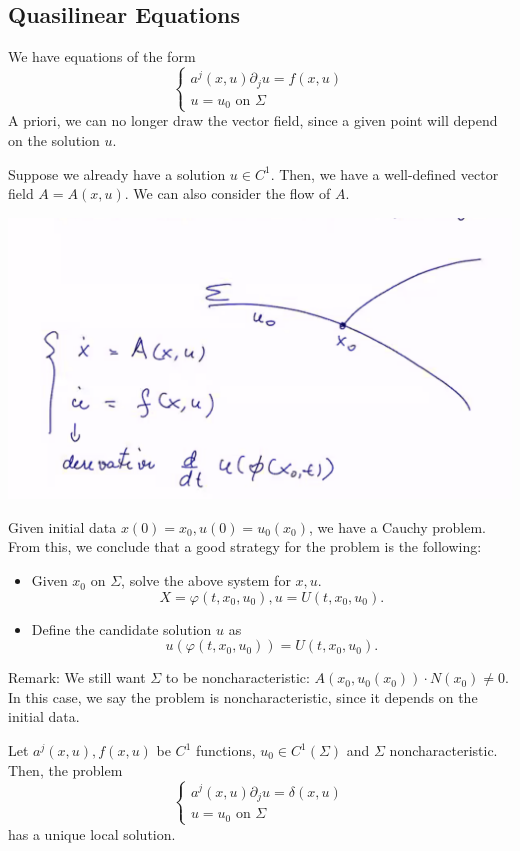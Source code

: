 \documentclass[11pt]{scrartcl}
\let \phi \varphi
\begin{document}
\subsection{Quasilinear Equations}
We have equations of the form
$$\begin{cases}
a^j(x, u)\partial_j u = f(x, u)\\
u = u_0 \text{ on } \Sigma
\end{cases}$$
A priori, we can no longer draw the vector field, since a given point will depend on the solution $u$.  

Suppose we already have a solution $u \in C^1$.  Then, we have a well-defined vector field $A = A(x, u)$.  We can also consider the flow of $A$.

 \begin{center}
\includegraphics[scale=0.6]{quasi.png}
\end{center}
Given initial data $x(0) = x_0, u(0) = u_0(x_0)$, we have a Cauchy problem.  From this, we conclude that a good strategy for the problem is the following:
\begin{itemize}
\item Given $x_0$ on $\Sigma$, solve the above system for $x, u$.  
$$X = \phi(t, x_0, u_0), u = U(t, x_0, u_0).$$
\item Define the candidate solution $u$ as $$u(\phi(t, x_0, u_0)) = U(t, x_0, u_0).$$
\end{itemize}
Remark: We still want $\Sigma$ to be noncharacteristic: $A(x_0, u_0(x_0)) \cdot N(x_0) \ne 0$.  In this case, we say the problem is noncharacteristic, since it depends on the initial data.
\begin{thm} Let $a^j(x, u), f(x, u)$ be $C^1$ functions, $u_0 \in C^1(\Sigma)$ and $\Sigma$ noncharacteristic.  Then, the problem
$$\begin{cases}
a^j(x, u)\partial_j u = \delta(x, u)\\
u = u_0 \text{ on }\Sigma
\end{cases}$$
has a unique local solution.
\end{thm}
\end{document}
